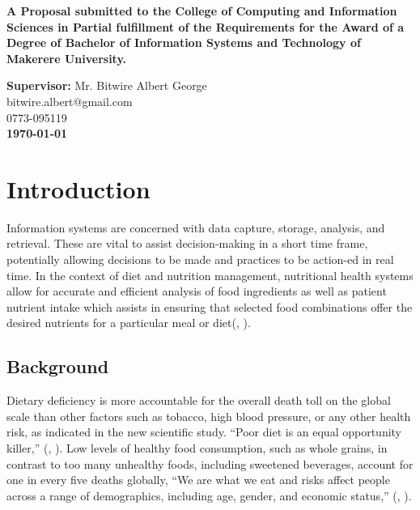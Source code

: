 \documentclass{article}
\begin{document}
\begin{center}
\begin{center}
\textbf{A Proposal submitted to the College of Computing and Information Sciences in Partial fulfillment of the Requirements for the Award of a Degree of Bachelor of Information Systems and Technology of Makerere University.}
\end{center}

\vspace{3pt} 
\textbf{Supervisor:} Mr. Bitwire Albert George \\
 bitwire.albert@gmail.com \\ 0773-095119 \\

\vspace{25pt} 
\textbf{\today}
\end{center}

\newpage
\tableofcontents
\newpage
\listoftables
\newpage
\listoffigures
\newpage

\section{Introduction}
\label{Introducion}
Information systems are concerned with data capture, storage, analysis, and retrieval. These are vital to assist decision-making in a short time frame, potentially allowing decisions to be made and practices to be action-ed in real time.  In the context of diet and nutrition management, nutritional health systems allow for accurate and efficient analysis of food ingredients as well as patient nutrient intake which assists in ensuring that selected food combinations offer the desired nutrients for a particular meal or diet(\citeauthor{DFM}, \citeyear{DFM}). 


\subsection{Background}
\label{Background}
Dietary deficiency is more accountable for the overall death toll on the global scale than other factors such as tobacco, high blood pressure, or any other health risk, as indicated in the new scientific study. “Poor diet is an equal opportunity killer,” (\citeauthor{ihme2019new}, \citeyear{ihme2019new}). Low levels of healthy food consumption, such as whole grains, in contrast to too many unhealthy foods, including sweetened beverages, account for one in every five deaths globally, “We are what we eat and risks affect people across a range of demographics, including age, gender, and economic status,” (\citeauthor{ihme2019new}, \citeyear{ihme2019new}).
\end{document}
